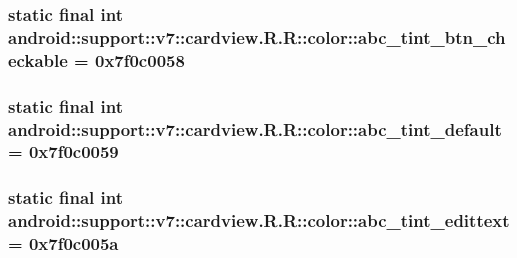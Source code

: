 \hypertarget{classandroid_1_1support_1_1v7_1_1cardview_1_1_r_1_1color_952f70e700a4f1aac2723bfd7c4ff3ca}{
\subsubsection[{abc\_\-tint\_\-btn\_\-checkable}]{\setlength{\rightskip}{0pt plus 5cm}static final int android::support::v7::cardview.R.R::color::abc\_\-tint\_\-btn\_\-checkable = 0x7f0c0058}}
\label{classandroid_1_1support_1_1v7_1_1cardview_1_1_r_1_1color_952f70e700a4f1aac2723bfd7c4ff3ca}


\hypertarget{classandroid_1_1support_1_1v7_1_1cardview_1_1_r_1_1color_bdf4dbaabb6804825258cc5727e0e543}{
\subsubsection[{abc\_\-tint\_\-default}]{\setlength{\rightskip}{0pt plus 5cm}static final int android::support::v7::cardview.R.R::color::abc\_\-tint\_\-default = 0x7f0c0059}}
\label{classandroid_1_1support_1_1v7_1_1cardview_1_1_r_1_1color_bdf4dbaabb6804825258cc5727e0e543}


\hypertarget{classandroid_1_1support_1_1v7_1_1cardview_1_1_r_1_1color_7aa8ec310c330f4195afe83d64101a92}{
\subsubsection[{abc\_\-tint\_\-edittext}]{\setlength{\rightskip}{0pt plus 5cm}static final int android::support::v7::cardview.R.R::color::abc\_\-tint\_\-edittext = 0x7f0c005a}}
\label{classandroid_1_1support_1_1v7_1_1cardview_1_1_r_1_1color_7aa8ec310c330f4195afe83d64101a92}


